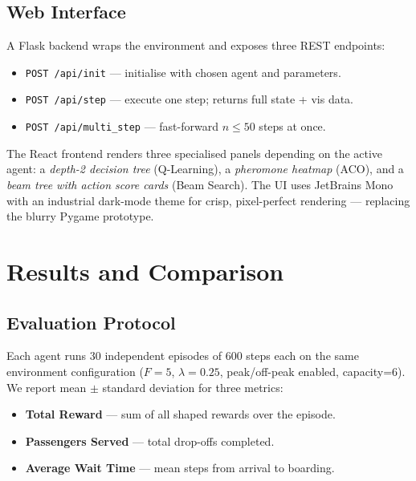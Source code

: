 \documentclass[12pt,a4paper]{article}
\begin{document}
\subsection{Web Interface}

A Flask backend wraps the environment and exposes three REST endpoints:

\begin{itemize}[leftmargin=2em]
    \item \texttt{POST /api/init} — initialise with chosen agent and parameters.
    \item \texttt{POST /api/step} — execute one step; returns full state + vis data.
    \item \texttt{POST /api/multi\_step} — fast-forward $n \leq 50$ steps at once.
\end{itemize}

The React frontend renders three specialised panels depending on the active agent:
a \emph{depth-2 decision tree} (Q-Learning), a \emph{pheromone heatmap} (ACO),
and a \emph{beam tree with action score cards} (Beam Search).
The UI uses JetBrains Mono with an industrial dark-mode theme for crisp,
pixel-perfect rendering — replacing the blurry Pygame prototype.

\section{Results and Comparison}

\subsection{Evaluation Protocol}

Each agent runs 30 independent episodes of 600 steps each on the same environment
configuration ($F=5$, $\lambda=0.25$, peak/off-peak enabled, capacity=6).
We report mean $\pm$ standard deviation for three metrics:

\begin{itemize}[leftmargin=2em]
    \item \textbf{Total Reward} — sum of all shaped rewards over the episode.
    \item \textbf{Passengers Served} — total drop-offs completed.
    \item \textbf{Average Wait Time} — mean steps from arrival to boarding.
\end{itemize}
\end{document}
